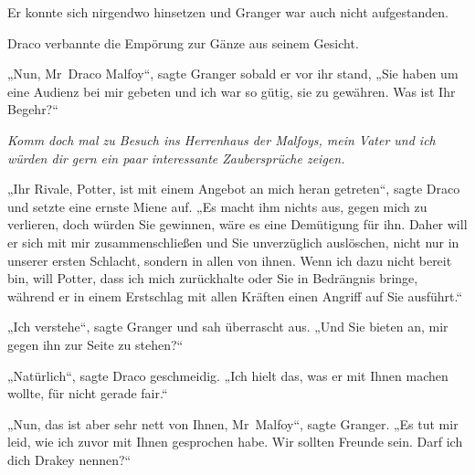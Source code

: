 Er konnte sich nirgendwo hinsetzen und Granger war auch nicht aufgestanden.

Draco verbannte die Empörung zur Gänze aus seinem Gesicht.

„Nun, Mr~Draco Malfoy“, sagte Granger sobald er vor ihr stand, „Sie haben um eine Audienz bei mir gebeten und ich war so gütig, sie zu gewähren. Was ist Ihr Begehr?“

\emph{Komm doch mal zu Besuch ins Herrenhaus der Malfoys, mein Vater und ich würden dir gern ein paar interessante Zaubersprüche zeigen.}

„Ihr Rivale, Potter, ist mit einem Angebot an mich heran getreten“, sagte Draco und setzte eine ernste Miene auf. „Es macht ihm nichts aus, gegen mich zu verlieren, doch würden Sie gewinnen, wäre es eine Demütigung für ihn. Daher will er sich mit mir zusammenschließen und Sie unverzüglich auslöschen, nicht nur in unserer ersten Schlacht, sondern in allen von ihnen. Wenn ich dazu nicht bereit bin, will Potter, dass ich mich zurückhalte oder Sie in Bedrängnis bringe, während er in einem Erstschlag mit allen Kräften einen Angriff auf Sie ausführt.“

„Ich verstehe“, sagte Granger und sah überrascht aus. „Und Sie bieten an, mir gegen ihn zur Seite zu stehen?“

„Natürlich“, sagte Draco geschmeidig. „Ich hielt das, was er mit Ihnen machen wollte, für nicht gerade fair.“

„Nun, das ist aber sehr nett von Ihnen, Mr~Malfoy“, sagte Granger. „Es tut mir leid, wie ich zuvor mit Ihnen gesprochen habe. Wir sollten Freunde sein. Darf ich dich Drakey nennen?“

